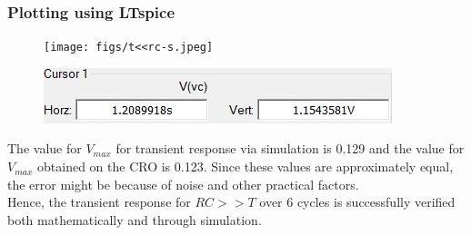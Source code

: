 \documentclass[journal]{IEEEtran}
\begin{document}
\subsubsection{Plotting using LTspice}
\begin{figure}[H]
    \centering
    \texttt{[image: figs/t<<rc-s.jpeg]}
\end{figure}
\begin{figure}[H]
    \centering
    \includegraphics[width=0.7\linewidth]{figs/ip3.jpeg}
\end{figure}
The value for $V_{max}$ for transient response via simulation is 0.129 and the value for $V_{max}$ obtained on the CRO is 0.123. Since these values are approximately equal, the error might be because of noise and other practical factors.\\
Hence, the transient response for $RC >> T$ over 6 cycles is successfully verified both mathematically and through simulation.
\end{document}
